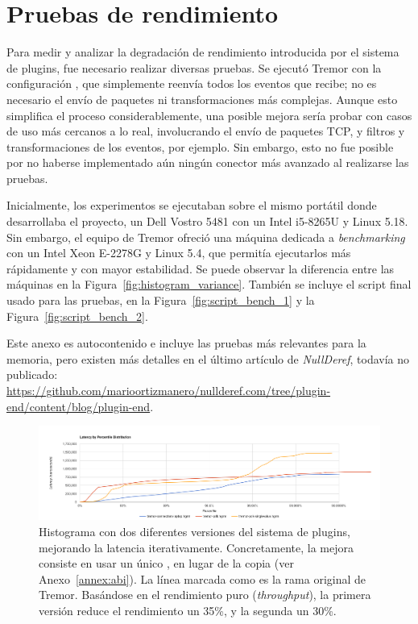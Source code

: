 \chapter{Pruebas de rendimiento}\label{annex:benchmarks}

Para medir y analizar la degradación de rendimiento introducida por el sistema
de plugins, fue necesario realizar diversas pruebas. Se ejecutó Tremor con la
configuración , que simplemente reenvía todos los eventos que
recibe; no es necesario el envío de paquetes ni transformaciones más complejas.
Aunque esto simplifica el proceso considerablemente, una posible mejora sería
probar con casos de uso más cercanos a lo real, involucrando el envío de
paquetes TCP, y filtros y transformaciones de los eventos, por ejemplo. Sin
embargo, esto no fue posible por no haberse implementado aún ningún conector más
avanzado al realizarse las pruebas.

Inicialmente, los experimentos se ejecutaban sobre el mismo portátil donde
desarrollaba el proyecto, un Dell Vostro 5481 con un Intel i5-8265U y Linux
5.18. Sin embargo, el equipo de Tremor ofreció una máquina dedicada a
\emph{benchmarking} con un Intel Xeon E-2278G y Linux 5.4, que permitía
ejecutarlos más rápidamente y con mayor estabilidad. Se puede observar la
diferencia entre las máquinas en la Figura~\ref{fig:histogram_variance}. También
se incluye el script final usado para las pruebas, en la
Figura~\ref{fig:script_bench_1} y la Figura~\ref{fig:script_bench_2}.

Este anexo es autocontenido e incluye las pruebas más relevantes para la
memoria, pero existen más detalles en el último artículo de \emph{NullDeref},
todavía no publicado:\\
\url{https://github.com/marioortizmanero/nullderef.com/tree/plugin-end/content/blog/plugin-end}.

\begin{figure}
    \centering
    \includegraphics[width=\textwidth]{./Imagenes/histogram_pdk.png}
    \caption{Histograma con dos diferentes versiones del sistema de plugins,
    mejorando la latencia iterativamente. Concretamente, la mejora consiste en
    usar un único , en lugar de la copia  (ver
    Anexo~\ref{annex:abi}). La línea marcada como
     es la rama original de Tremor. Basándose en
    el rendimiento puro (\emph{throughput}), la primera versión reduce el
    rendimiento un 35\%, y la segunda un 30\%.}%
    \label{fig:histogram_pdk}
\end{figure}

